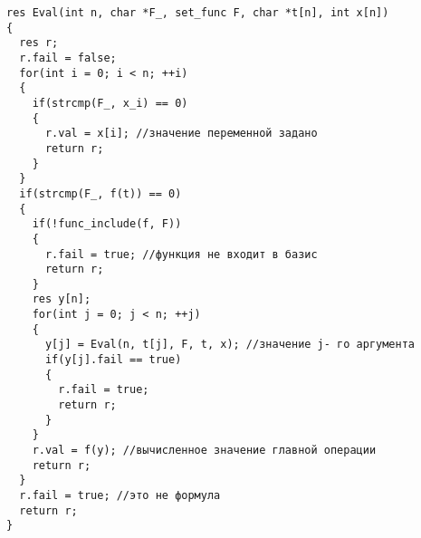 \documentclass[a5paper]{article}
\begin{document}
\begin{lstlisting}
res Eval(int n, char *F_, set_func F, char *t[n], int x[n])
{
  res r;
  r.fail = false;
  for(int i = 0; i < n; ++i)
  {
    if(strcmp(F_, x_i) == 0)
    {
      r.val = x[i]; //значение переменной задано
      return r;
    }
  }
  if(strcmp(F_, f(t)) == 0)
  {
    if(!func_include(f, F))
    {
      r.fail = true; //функция не входит в базис
      return r;
    }
    res y[n];
    for(int j = 0; j < n; ++j)
    {
      y[j] = Eval(n, t[j], F, t, x); //значение j- го аргумента
      if(y[j].fail == true)
      {
        r.fail = true;
        return r;
      }
    }
    r.val = f(y); //вычисленное значение главной операции
    return r;
  }
  r.fail = true; //это не формула
  return r;
}
\end{lstlisting}
\end{document}
